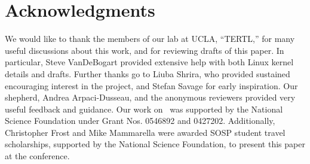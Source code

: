 \section*{Acknowledgments}

We would like to thank the members of our lab at UCLA, ``TERTL,'' for many
useful discussions about this work, and for reviewing drafts of this paper. In
particular, Steve VanDeBogart provided extensive help with both Linux
kernel details and drafts. Further thanks go to Liuba
Shrira, who provided sustained encouraging interest in the project, and
Stefan Savage for early inspiration.
Our shepherd, Andrea Arpaci-Dusseau, and the anonymous reviewers
provided very useful feedback and guidance.
%
Our work on \Kudos\ was supported by the National Science
 Foundation under Grant Nos. 0546892 and 0427202.
%
Additionally, Christopher Frost and Mike Mammarella were awarded SOSP student
travel scholarships, supported by the National Science Foundation, to present
this paper at the conference.
